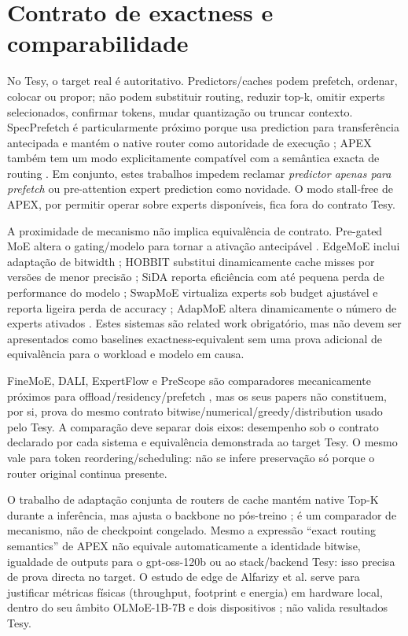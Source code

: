 \section{Contrato de exactness e comparabilidade}
No Tesy, o target real é autoritativo. Predictors/caches podem prefetch, ordenar, colocar ou propor; não podem substituir routing, reduzir top-k, omitir experts selecionados, confirmar tokens, mudar quantização ou truncar contexto. SpecPrefetch é particularmente próximo porque usa prediction para transferência antecipada e mantém o native router como autoridade de execução \cite{kong2026specprefetch}; APEX também tem um modo explicitamente compatível com a semântica exacta de routing \cite{kanani2026apex}. Em conjunto, estes trabalhos impedem reclamar \emph{predictor apenas para prefetch} ou pre-attention expert prediction como novidade. O modo stall-free de APEX, por permitir operar sobre experts disponíveis, fica fora do contrato Tesy.

A proximidade de mecanismo não implica equivalência de contrato. Pre-gated MoE altera o gating/modelo para tornar a ativação antecipável \cite{hwang2024pregated}. EdgeMoE inclui adaptação de bitwidth \cite{yi2023edgemoe}; HOBBIT substitui dinamicamente cache misses por versões de menor precisão \cite{tang2024hobbit}; SiDA reporta eficiência com até pequena perda de performance do modelo \cite{du2024sida}; SwapMoE virtualiza experts sob budget ajustável e reporta ligeira perda de accuracy \cite{kong2024swapmoe}; AdapMoE altera dinamicamente o número de experts ativados \cite{zhong2024adapmoe}. Estes sistemas são related work obrigatório, mas não devem ser apresentados como baselines exactness-equivalent sem uma prova adicional de equivalência para o workload e modelo em causa.

FineMoE, DALI, ExpertFlow e PreScope são comparadores mecanicamente próximos para offload/residency/prefetch \cite{yu2026finemoe,zhu2026dali,he2026expertflow,yu2025prescope}, mas os seus papers não constituem, por si, prova do mesmo contrato bitwise/numerical/greedy/distribution usado pelo Tesy. A comparação deve separar dois eixos: desempenho sob o contrato declarado por cada sistema e equivalência demonstrada ao target Tesy. O mesmo vale para token reordering/scheduling: não se infere preservação só porque o router original continua presente.

O trabalho de adaptação conjunta de routers de cache mantém native Top-K durante a inferência, mas ajusta o backbone no pós-treino \cite{wu2026cacheaware}; é um comparador de mecanismo, não de checkpoint congelado. Mesmo a expressão “exact routing semantics” de APEX não equivale automaticamente a identidade bitwise, igualdade de outputs para o gpt-oss-120b ou ao stack/backend Tesy: isso precisa de prova directa no target. O estudo de edge de Alfarizy et al. serve para justificar métricas físicas (throughput, footprint e energia) em hardware local, dentro do seu âmbito OLMoE-1B-7B e dois dispositivos \cite{alfarizy2026consumer}; não valida resultados Tesy.

